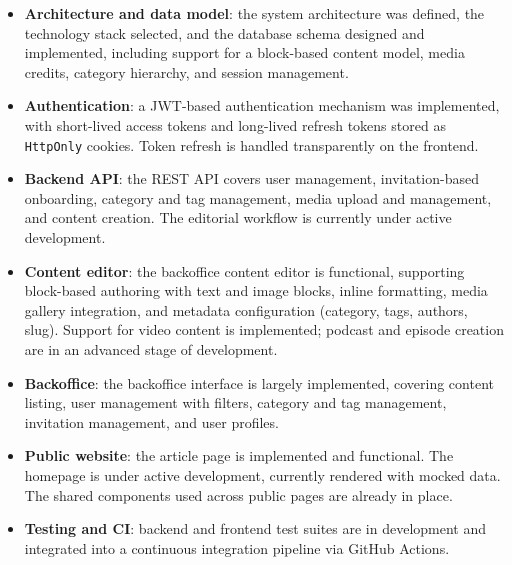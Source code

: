 \begin{itemize}
      \item \textbf{Architecture and data model}: the system architecture was defined,
            the technology stack selected, and the database schema designed and implemented,
            including support for a block-based content model, media credits, category
            hierarchy, and session management.

      \item \textbf{Authentication}: a JWT-based authentication mechanism was implemented,
            with short-lived access tokens and long-lived refresh tokens stored as
            \texttt{HttpOnly} cookies. Token refresh is handled transparently on the
            frontend.

      \item \textbf{Backend API}: the REST API covers user management,
            invitation-based onboarding, category and tag management, media upload and
            management, and content creation. The editorial workflow is currently under
            active development.

      \item \textbf{Content editor}: the backoffice content editor is functional,
            supporting block-based authoring with text and image blocks, inline formatting,
            media gallery integration, and metadata configuration (category, tags, authors,
            slug). Support for video content is implemented; podcast and episode creation
            are in an advanced stage of development.

      \item \textbf{Backoffice}: the backoffice interface is largely implemented, covering
            content listing, user management with filters, category and tag management,
            invitation management, and user profiles.

      \item \textbf{Public website}: the article page is implemented and functional.
            The homepage is under active development, currently rendered with mocked data.
            The shared components used across public pages are already in place.

      \item \textbf{Testing and CI}: backend and frontend test suites are in development and
            integrated into a continuous integration pipeline via GitHub Actions.
\end{itemize}

